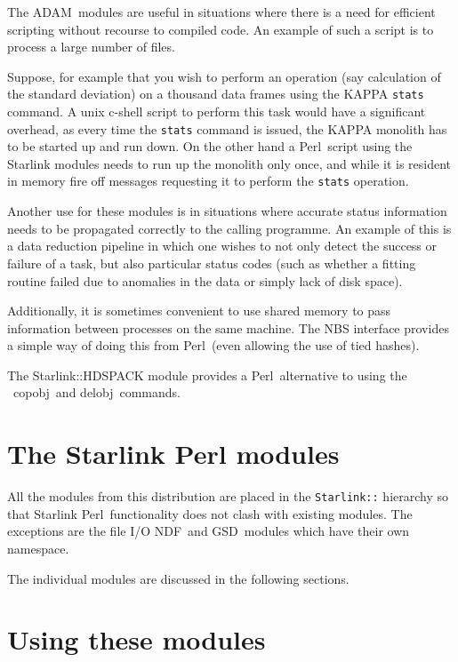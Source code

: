 \documentclass[twoside,11pt]{article}
\newcommand{\task}[1]{{\sf #1}}
\newcommand{\Figaro}{\xref{{\sc{Figaro}}}{sun86}{}}
\newcommand{\ADAM}{\xref{{ADAM}}{sun144}{}}
\newcommand{\gsd}{\xref{{GSD}}{sun229}{}}
\newcommand{\ndf}{\xref{NDF}{sun33}{}}
\newcommand{\perl}{\xref{\textsf{Perl}}{sun193}{}}
\newcommand{\delobj}{\xref{\task{delobj}}{sun86}{DELOBJ}}
\newcommand{\copobj}{\xref{\task{copobj}}{sun86}{COPOBJ}}
\newcommand{\xref}[3]{#1}
\renewcommand{\_}{\texttt{\symbol{95}}}
\begin{document}
The \ADAM\  modules are useful in situations where there is a need for
efficient scripting without recourse to compiled code. An example of
such a script is to process a large number of files.

Suppose, for example that you wish to perform an operation (say calculation of
the standard deviation) on a thousand data frames using the
\xref{KAPPA}{sun95}{} \xref{\texttt{stats}}{sun95}{STATS} command. A unix
c-shell script to perform this task would have a significant overhead, as
every time the \texttt{stats} command is issued, the \xref{KAPPA}{sun95}{}
monolith has to be started up and run down. On the other hand a \perl\ script
using the Starlink modules needs to run up the monolith only once, and while
it is resident in memory fire off messages requesting it to perform the
\xref{\texttt{stats}}{sun95}{STATS} operation.

Another use for these modules is in situations where accurate status
information needs to be propagated correctly to the calling
programme. An example of this is a data reduction pipeline in which
one wishes to not only detect the success or failure of a task, but
also particular status codes (such as whether a fitting routine failed
due to anomalies in the data or simply lack of disk space).

Additionally, it is sometimes convenient to use shared memory to pass
information between processes on the same machine. The NBS interface
provides a simple way of doing this from \perl\ (even allowing the use
of tied hashes).

The Starlink::HDSPACK module provides a \perl\ alternative to using the
\Figaro\ \copobj\ and \delobj\ commands.

\section{The Starlink Perl modules}

All the modules from this distribution are placed in the \texttt{Starlink::}
hierarchy so that Starlink \perl\ functionality does not clash with existing
modules.  The exceptions are the file I/O \ndf\ and \gsd\ modules which have 
their own namespace.

The individual modules are discussed in the following sections.

\section{Using these modules}
\end{document}
